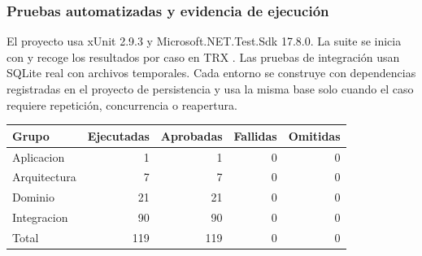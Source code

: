 \clearpage
\subsubsection{Pruebas automatizadas y evidencia de ejecución}
El proyecto  usa xUnit 2.9.3 y Microsoft.NET.Test.Sdk 17.8.0. La suite se inicia con  y recoge los resultados por caso en TRX \cite{xunit}. Las pruebas de integración usan SQLite real con archivos temporales. Cada entorno se construye con dependencias registradas en el proyecto de persistencia y usa la misma base solo cuando el caso requiere repetición, concurrencia o reapertura.

\begin{center}
\begin{tabular}{@{}lrrrr@{}}\toprule
Grupo & Ejecutadas & Aprobadas & Fallidas & Omitidas\\\midrule
Aplicacion & 1 & 1 & 0 & 0 \\
Arquitectura & 7 & 7 & 0 & 0 \\
Dominio & 21 & 21 & 0 & 0 \\
Integracion & 90 & 90 & 0 & 0 \\
\midrule Total & 119 & 119 & 0 & 0\\\bottomrule
\end{tabular}
\end{center}

